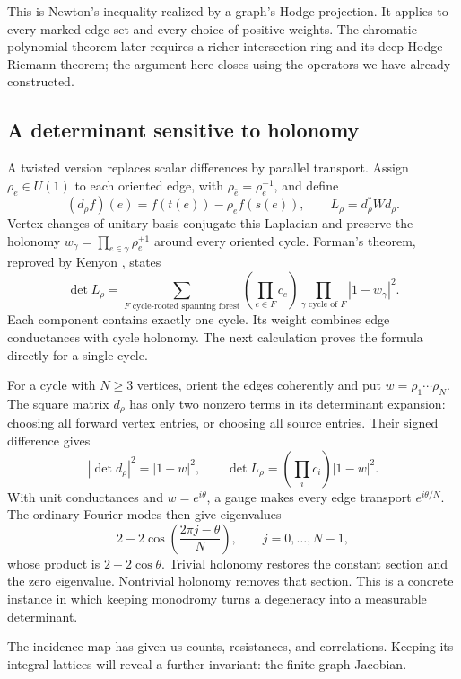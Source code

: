 \documentclass[11pt]{article}
\theoremstyle{definition}
\theoremstyle{remark}
\begin{document}
This is Newton's inequality realized by a graph's Hodge projection.
It applies to every marked edge set and every choice of positive weights.
The chromatic-polynomial theorem later requires a richer intersection
ring and its deep Hodge--Riemann theorem; the argument here closes using
the operators we have already constructed.


\subsection{A determinant sensitive to holonomy}

A twisted version replaces scalar differences by parallel transport. Assign $\rho_e\in U(1)$ to each oriented edge, with $\rho_{\bar e}=\rho_e^{-1}$, and define
\[
 (d_\rho f)(e)=f(t(e))-\rho_e f(s(e)),\qquad
 L_\rho=d_\rho^*W d_\rho.
\]
Vertex changes of unitary basis conjugate this Laplacian and preserve the holonomy $w_\gamma=\prod_{e\in\gamma}\rho_e^{\pm1}$ around every oriented cycle. Forman's theorem, reproved by Kenyon \cite{glinKenyon2011}, states
\begin{equation}\label{eq:glin-crsf}
 \det L_\rho=
 \sum_{F\text{ cycle-rooted spanning forest}}
 \left(\prod_{e\in F}c_e\right)
 \prod_{\gamma\text{ cycle of }F}|1-w_\gamma|^2.
\end{equation}
Each component contains exactly one cycle. Its weight combines edge conductances with cycle holonomy. The next calculation proves the formula directly for a single cycle.

For a cycle with $N\ge3$ vertices, orient the edges coherently and put $w=\rho_1\cdots\rho_N$. The square matrix $d_\rho$ has only two nonzero terms in its determinant expansion: choosing all forward vertex entries, or choosing all source entries. Their signed difference gives
\[
 |\det d_\rho|^2=|1-w|^2,
 \qquad
 \det L_\rho=\left(\prod_i c_i\right)|1-w|^2.
\]
With unit conductances and $w=e^{i\theta}$, a gauge makes every edge transport $e^{i\theta/N}$. The ordinary Fourier modes then give eigenvalues
\[
 2-2\cos\left(\frac{2\pi j-\theta}{N}\right),
 \qquad j=0,\ldots,N-1,
\]
whose product is $2-2\cos\theta$. Trivial holonomy restores the constant section and the zero eigenvalue. Nontrivial holonomy removes that section. This is a concrete instance in which keeping monodromy turns a degeneracy into a measurable determinant.

The incidence map has given us counts, resistances, and correlations. Keeping its integral lattices will reveal a further invariant: the finite graph Jacobian.
\end{document}
